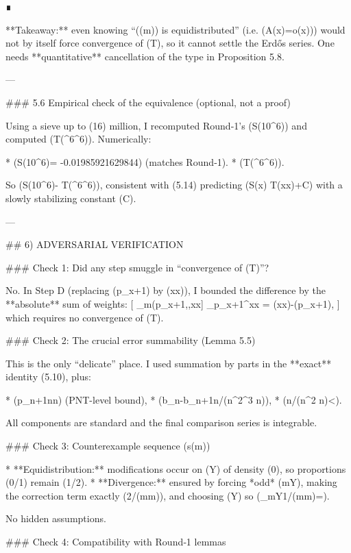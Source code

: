 ∎

**Takeaway:** even knowing “(\pi(m)) is equidistributed” (i.e. (A(x)=o(x))) would not by itself force convergence of (T), so it cannot settle the Erdős series. One needs **quantitative** cancellation of the type in Proposition 5.8.

---

### 5.6 Empirical check of the equivalence (optional, not a proof)

Using a sieve up to (16) million, I recomputed Round‑1’s (S(10^6)) and computed (T(^6^6\rfloor)). Numerically:

* (S(10^6)= -0.01985921629844) (matches Round‑1).
* (T(^6^6\rfloor)).

So (S(10^6)- T(^6^6\rfloor)), consistent with (5.14) predicting (S(x)\approx {} T(x\log x)+C) with a slowly stabilizing constant (C).

---

## 6) ADVERSARIAL VERIFICATION

### Check 1: Did any step smuggle in “convergence of (T)”?

No. In Step D (replacing (p_{x+1}) by (x\log x)), I bounded the difference by the **absolute** sum of weights:
[
\sum_{m\in (p_{x+1},,x\log x]} 
\le \int_{p_{x+1}}^{x\log x}
= \log\log(x\log x)-\log\log(p_{x+1}),
]
which requires no convergence of (T).

### Check 2: The crucial error summability (Lemma 5.5)

This is the only “delicate” place. I used summation by parts in the **exact** identity (5.10), plus:

* (p_{n+1}\ll n\log n) (PNT-level bound),
* (b_n-b_{n+1}\ll \log\log n/(n^2\log^3 n)),
* (\sum \log\log n/(n\log^2 n)<\infty).

All components are standard and the final comparison series is integrable.

### Check 3: Counterexample sequence (s(m))

* **Equidistribution:** modifications occur on (Y) of density (0), so proportions (0/1) remain (1/2).
* **Divergence:** ensured by forcing *odd* (m\in Y), making the correction term exactly (2/(m\log m)), and choosing (Y) so (\sum_{m\in Y}1/(m\log m)=\infty).

No hidden assumptions.

### Check 4: Compatibility with Round‑1 lemmas


